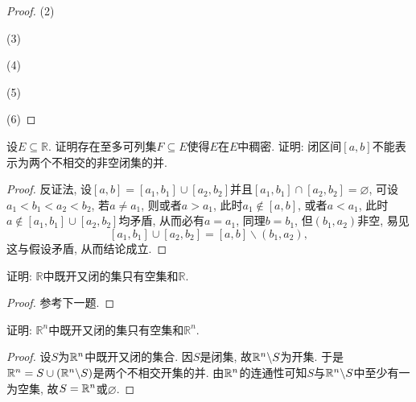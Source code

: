 \begin{quiza}
\begin{proof}
	(2)
	
	(3)
	
	(4)
	
	(5)
	
	(6)
\end{proof}
\woe 设\(E\subseteq \mathbb{R}\). 证明存在至多可列集\(F\subseteq E\)使得\(E\)在\(E\)中稠密.
\woe 证明: 闭区间\([a,b]\)不能表示为两个不相交的非空闭集的并.
\begin{proof}
	反证法, 设\([a,b]=[a_1,b_1]\cup [a_2,b_2]\)并且\([a_1,b_1]\cap [a_2,b_2]=\varnothing\), 可设\(a_1<b_1<a_2<b_2\), 若\(a\ne a_1\), 则或者\(a>a_1\), 此时\(a_1\notin [a,b]\), 或者\(a<a_1\), 此时\(a\notin[a_1,b_1]\cup[a_2,b_2]\)均矛盾, 从而必有\(a=a_1\), 同理\(b=b_1\), 但\((b_1,a_2)\)非空, 易见\[[a_1,b_1]\cup [a_2,b_2]=[a,b]\backslash (b_1,a_2),\]这与假设矛盾, 从而结论成立.
\end{proof}
\woe 证明: \(\mathbb{R}\)中既开又闭的集只有空集和\(\mathbb{R}\).
\begin{proof}
参考下一题.	
\end{proof}
\woe 证明: \(\mathbb{R}^n\)中既开又闭的集只有空集和\(\mathbb{R}^n\).
\begin{proof}
	设\(S\)为\(\mathbb{R}^n\)中既开又闭的集合. 因\(S\)是闭集, 故\(\mathbb{R}^n\backslash S\)为开集. 于是\(\mathbb{R}^n=S\cup\left(\mathbb{R}^n\backslash S\right)\)是两个不相交开集的并. 由\(\mathbb{R}^n\)的连通性可知\(S\)与\(\mathbb{R}^n\backslash S\)中至少有一为空集, 故\(S=\mathbb{R}^n\)或\(\varnothing\).
\end{proof}
\end{quiza}

